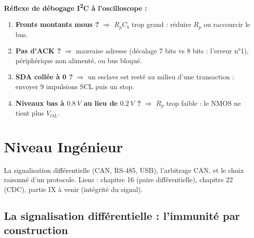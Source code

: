 \documentclass[12pt,a4paper,twoside]{book}
\begin{document}
\begin{pratique}
\textbf{Réflexe de débogage I\textsuperscript{2}C à l'oscilloscope :}
\begin{enumerate}[nosep]
\item \textbf{Fronts montants mous ?} $\Rightarrow$ $R_p C_b$ trop grand : réduire $R_p$ ou raccourcir le bus.
\item \textbf{Pas d'ACK ?} $\Rightarrow$ mauvaise adresse (décalage 7 bits vs 8 bits : l'erreur n°1), périphérique non alimenté, ou bus bloqué.
\item \textbf{SDA collée à 0 ?} $\Rightarrow$ un esclave est resté au milieu d'une transaction : envoyer 9 impulsions SCL puis un stop.
\item \textbf{Niveaux bas à $\SI{0.8}{V}$ au lieu de $\SI{0.2}{V}$ ?} $\Rightarrow$ $R_p$ trop faible : le NMOS ne tient plus $V_{OL}$.
\end{enumerate}
\end{pratique}

\section{Niveau Ingénieur}

\begin{ingenieur}
La signalisation différentielle (CAN, RS-485, USB), l'arbitrage CAN, et le choix raisonné d'un protocole. Liens : chapitre 16 (paire différentielle), chapitre 22 (CDC), partie IX à venir (intégrité du signal).
\end{ingenieur}

\subsection{La signalisation différentielle : l'immunité par construction}
\end{document}
